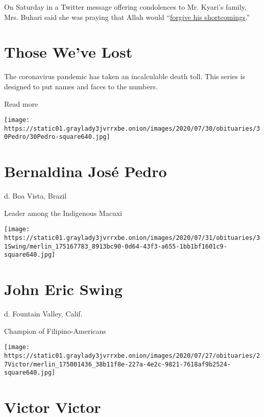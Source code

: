 On Saturday in a Twitter message offering condolences to Mr. Kyari's
family, Mrs. Buhari said she was praying that Allah would
``\href{https://twitter.com/aishambuhari/status/1251484410941255680}{forgive
his shortcomings}.''

\href{https://www.nytimes3xbfgragh.onion/interactive/2020/obituaries/people-died-coronavirus-obituaries.html?action=click\&pgtype=Article\&state=default\&region=BELOW_MAIN_CONTENT\&context=covid_obits_promo}{}

\hypertarget{those-weve-lost}{%
\section{Those We've Lost}\label{those-weve-lost}}

The coronavirus pandemic has taken an incalculable death toll. This
series is designed to put names and faces to the numbers.

Read more

\texttt{[image: https://static01.graylady3jvrrxbe.onion/images/2020/07/30/obituaries/30Pedro/30Pedro-square640.jpg]}

\hypertarget{bernaldina-josuxe9-pedro}{%
\section{Bernaldina José Pedro}\label{bernaldina-josuxe9-pedro}}

d. Boa Vista, Brazil

Leader among the Indigenous Macuxi

\texttt{[image: https://static01.graylady3jvrrxbe.onion/images/2020/07/31/obituaries/31Swing/merlin\_175167783\_8913bc90-0d64-43f3-a655-1bb1bf1601c9-square640.jpg]}

\hypertarget{john-eric-swing}{%
\section{John Eric Swing}\label{john-eric-swing}}

d. Fountain Valley, Calif.

Champion of Filipino-Americans

\texttt{[image: https://static01.graylady3jvrrxbe.onion/images/2020/07/27/obituaries/27Victor/merlin\_175001436\_38b11f8e-227a-4e2c-9821-7618af9b2524-square640.jpg]}

\hypertarget{victor-victor}{%
\section{Victor Victor}\label{victor-victor}}

